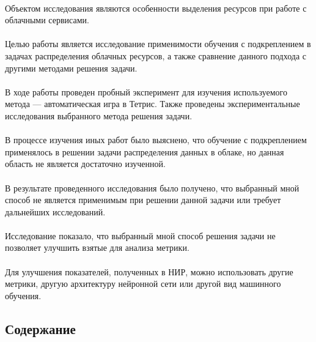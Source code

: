 \documentclass{article}
\begin{document}
~\\
Объектом исследования являются особенности выделения ресурсов при работе с облачными сервисами.\\
~\\
Целью работы является исследование применимости обучения с подкреплением в задачах распределения облачных ресурсов, а также сравнение данного подхода с другими методами решения задачи. \\
~\\
В ходе работы проведен пробный эксперимент для изучения используемого метода — автоматическая игра в Тетрис. Также проведены экспериментальные исследования выбранного метода решения задачи.\\
~\\
В процессе изучения иных работ было выяснено, что обучение с подкреплением применялось в решении задачи распределения данных в облаке, но данная область не является достаточно изученной.\\
~\\
В результате проведенного исследования было получено, что выбранный мной способ не является применимым при решении данной задачи или требует дальнейших исследований.\\
~\\
Исследование показало, что выбранный мной способ решения задачи не позволяет улучшить взятые для анализа метрики.\\
~\\
Для улучшения показателей, полученных в НИР, можно использовать другие метрики, другую архитектуру нейронной сети или другой вид машинного обучения.
\newpage
\begin{center}
\section {Содержание}
\tableofcontents
\end{center}
\newpage
\end{document}
